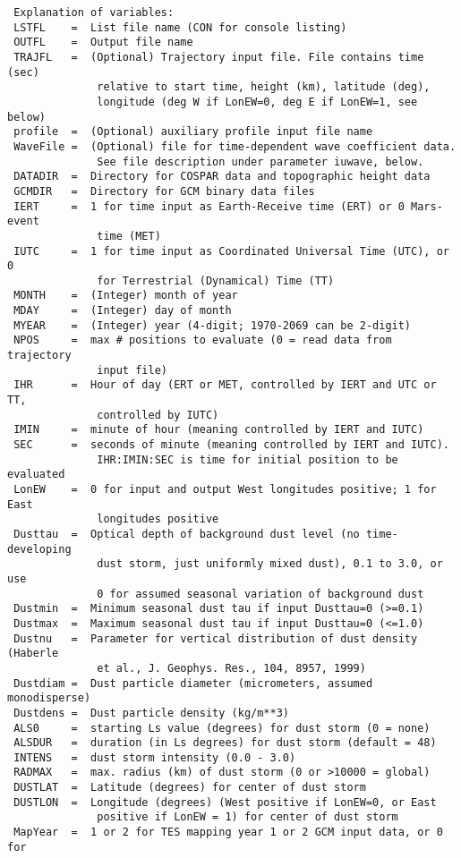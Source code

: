 \begin{lstlisting}
 Explanation of variables:
 LSTFL    =  List file name (CON for console listing)
 OUTFL    =  Output file name
 TRAJFL   =  (Optional) Trajectory input file. File contains time (sec)
              relative to start time, height (km), latitude (deg),
              longitude (deg W if LonEW=0, deg E if LonEW=1, see below)
 profile  =  (Optional) auxiliary profile input file name              
 WaveFile =  (Optional) file for time-dependent wave coefficient data.
              See file description under parameter iuwave, below.
 DATADIR  =  Directory for COSPAR data and topographic height data 
 GCMDIR   =  Directory for GCM binary data files
 IERT     =  1 for time input as Earth-Receive time (ERT) or 0 Mars-event 
              time (MET)
 IUTC     =  1 for time input as Coordinated Universal Time (UTC), or 0 
              for Terrestrial (Dynamical) Time (TT)
 MONTH    =  (Integer) month of year
 MDAY     =  (Integer) day of month
 MYEAR    =  (Integer) year (4-digit; 1970-2069 can be 2-digit)
 NPOS     =  max # positions to evaluate (0 = read data from trajectory
              input file)
 IHR      =  Hour of day (ERT or MET, controlled by IERT and UTC or TT, 
              controlled by IUTC)
 IMIN     =  minute of hour (meaning controlled by IERT and IUTC)
 SEC      =  seconds of minute (meaning controlled by IERT and IUTC).  
              IHR:IMIN:SEC is time for initial position to be evaluated
 LonEW    =  0 for input and output West longitudes positive; 1 for East
              longitudes positive
 Dusttau  =  Optical depth of background dust level (no time-developing
              dust storm, just uniformly mixed dust), 0.1 to 3.0, or use
              0 for assumed seasonal variation of background dust
 Dustmin  =  Minimum seasonal dust tau if input Dusttau=0 (>=0.1)
 Dustmax  =  Maximum seasonal dust tau if input Dusttau=0 (<=1.0)
 Dustnu   =  Parameter for vertical distribution of dust density (Haberle
              et al., J. Geophys. Res., 104, 8957, 1999)
 Dustdiam =  Dust particle diameter (micrometers, assumed monodisperse)
 Dustdens =  Dust particle density (kg/m**3)
 ALS0     =  starting Ls value (degrees) for dust storm (0 = none)
 ALSDUR   =  duration (in Ls degrees) for dust storm (default = 48)
 INTENS   =  dust storm intensity (0.0 - 3.0)
 RADMAX   =  max. radius (km) of dust storm (0 or >10000 = global)
 DUSTLAT  =  Latitude (degrees) for center of dust storm
 DUSTLON  =  Longitude (degrees) (West positive if LonEW=0, or East
              positive if LonEW = 1) for center of dust storm
 MapYear  =  1 or 2 for TES mapping year 1 or 2 GCM input data, or 0 for 

\end{lstlisting}
